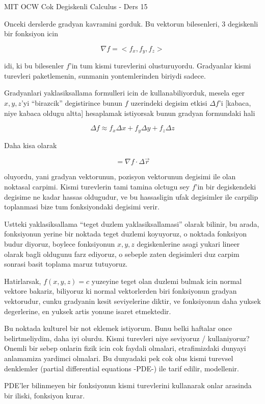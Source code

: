 \documentclass[12pt,fleqn]{article}
\begin{document}
MIT OCW Cok Degiskenli Calculus - Ders 15

Onceki derslerde gradyan kavramini gorduk. Bu vektorun bilesenleri, 3
degiskenli bir fonksiyon icin

\[ \nabla f = <f_x, f_y, f_z> \]

idi, ki bu bilesenler $f$'in tum kismi turevlerini
olusturuyordu. Gradyanlar kismi turevleri paketlemenin, sunmanin
yontemlerinden biriydi sadece. 

Gradyanlari yaklasiksallama formulleri icin de kullanabiliyorduk, mesela
eger $x,y,z$'yi ``birazcik'' degistirince bunun $f$ uzerindeki degisim
etkisi $\Delta f$'i [kabaca, niye kabaca oldugu altta] hesaplamak
istiyorsak bunun gradyan formundaki hali

\[ \Delta f \approx f_x \Delta x + f_y \Delta y + f_z \Delta z \]

Daha kisa olarak 

\[ = \nabla f \cdot \Delta \vec{r} \]

oluyordu, yani gradyan vektorunun, pozisyon vektorunun degisimi ile olan
noktasal carpimi. Kismi turevlerin tami tamina olctugu sey $f$'in bir
degiskendeki degisime ne kadar hassas oldugudur, ve bu hassasligin ufak
degisimler ile carpilip toplanmasi bize tum fonksiyondaki degisimi verir.

Ustteki yaklasiksallama ``teget duzlem yaklasiksallamasi'' olarak bilinir,
bu arada, fonksiyonun yerine bir noktada teget duzlemi koyuyoruz, o noktada
fonksiyon budur diyoruz, boylece fonksiyonun $x,y,z$ degiskenlerine asagi
yukari lineer olarak bagli oldugunu farz ediyoruz, o sebeple zaten
degisimleri duz carpim sonrasi basit toplama maruz tutuyoruz. 

Hatirlarsak, $f(x,y,z)=c$ yuzeyine teget olan duzlemi bulmak icin normal
vektore bakariz, biliyoruz ki normal vektorlerden biri fonksiyonun gradyan
vektorudur, cunku gradyanin kesit seviyelerine diktir, ve fonksiyonun daha
yuksek degerlerine, en yuksek artis yonune isaret etmektedir. 

Bu noktada kulturel bir not eklemek istiyorum. Bunu belki haftalar once
belirtmeliydim, daha iyi olurdu. Kismi turevleri niye seviyoruz /
kullaniyoruz? Onemli bir sebep onlarin fizik icin cok faydali olmalari,
etrafimizdaki dunyayi anlamamiza yardimci olmalari. Bu dunyadaki pek cok
olus kismi turevsel denklemler (partial differential equations -PDE-) ile
tarif edilir, modellenir.

PDE'ler bilinmeyen bir fonksiyonun kismi turevlerini kullanarak onlar
arasinda bir iliski, fonksiyon kurar. 
\end{document}

